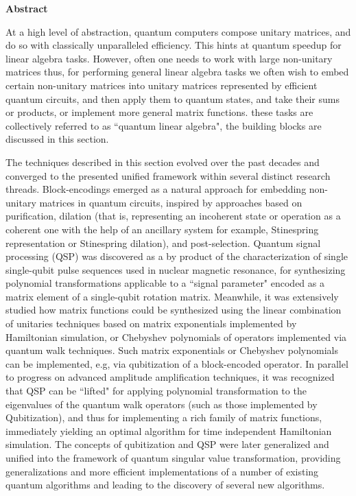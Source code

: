 \documentclass[12pt, oneside]{book}
\theoremstyle{definition}
\theoremstyle{definition}
\theoremstyle{remark}
\newcommand{\abstractname}{Abstract}
\newenvironment{abstract}{%
\clearpage
\null\vfill
\begin{center}%
    \bfseries \abstractname
\end{center}}%
{\vfill\null}
\begin{document}
\begin{abstract}
At a high level of abstraction, quantum computers compose unitary matrices, and do so with classically unparalleled efficiency. This hints at quantum speedup for linear algebra tasks. However, often one needs to work with large non-unitary matrices thus, for performing general linear algebra tasks we often wish to embed certain non-unitary matrices into unitary matrices represented by efficient quantum circuits, and then apply them to quantum states, and take their sums or products, or implement more general matrix functions. these tasks are collectively referred to as ``quantum linear algebra", the building blocks are discussed in this section.

The techniques described in this section evolved over the past decades and converged to the presented unified framework within several distinct research threads. Block-encodings emerged as a natural approach for embedding non-unitary matrices in quantum circuits, inspired by approaches based on purification, dilation (that is, representing an incoherent state or operation as a coherent one with the help of an ancillary system for example, Stinespring representation or Stinespring dilation), and post-selection. Quantum signal processing (QSP) was discovered as a by product of the characterization of single single-qubit pulse sequences used in nuclear magnetic resonance, for synthesizing polynomial transformations applicable to a ``signal parameter" encoded as a matrix element of a single-qubit rotation matrix. Meanwhile, it was extensively studied how matrix functions could be synthesized  using the linear combination of unitaries techniques based on matrix exponentials implemented by Hamiltonian simulation, or Chebyshev polynomials of operators implemented via quantum walk techniques. Such matrix exponentials or Chebyshev polynomials can be implemented, e.g, via qubitization of a block-encoded operator. In parallel to progress on advanced amplitude amplification techniques, it was recognized that QSP can be ``lifted" for applying polynomial transformation to the eigenvalues of the quantum walk operators (such as those implemented by Qubitization), and thus for implementing a rich family of matrix functions, immediately yielding an optimal algorithm for time independent Hamiltonian simulation. The concepts of qubitization and QSP were later generalized and unified into the framework of quantum singular value transformation, providing generalizations and more efficient implementations of a number of existing quantum algorithms and leading to the discovery of several new algorithms.
\end{abstract}
\end{document}

